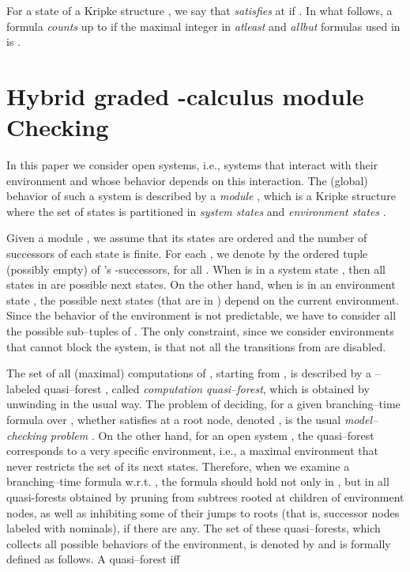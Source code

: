 \documentclass{LMCS}
\theoremstyle{plain}
\begin{document}
For a state  of a Kripke structure , we say that  \emph{satisfies}
 at  if . In what follows, a formula 
\emph{counts} up to  if the maximal integer in \emph{atleast} and
\emph{allbut} formulas used in  is .

\section{Hybrid graded -calculus module Checking}\label{sec:HybridGradedModuleChecking}
In this paper we consider open systems, i.e., systems that
interact with their environment and whose behavior depends on this
interaction. The (global) behavior of such a system is described
by a \emph{module} , which is a Kripke
structure where the set of states  is
partitioned in \emph{system states}  and \emph{environment
states} .

Given a module , we assume that its states are ordered and the
number of successors of each state  is finite. For each , we denote by  the ordered tuple (possibly empty) of
's -successors, for all . When  is
in a system state , then all states in  are
possible next states. On the other hand, when  is in an
environment state , the possible next states (that are in
) depend on the current environment. Since the behavior
of the environment is not predictable, we have to consider all the
possible sub--tuples of . The only constraint, since we
consider environments that cannot block the system, is that not
all the transitions from  are disabled.

The set of all (maximal) computations of , starting from
, is described by a --labeled quasi--forest
, called \emph{computation
quasi--forest}, which is obtained by unwinding  in the usual
way. The problem of deciding, for a given branching--time formula
 over , whether  satisfies  at a root node,
denoted , is the usual \emph{model--checking
problem} \cite{CE81,QS81}. On the other hand, for an open system
, the quasi--forest 
corresponds to a very specific environment, i.e., a maximal
environment that never restricts the set of its next states.
Therefore, when we examine a branching--time formula 
w.r.t. , the formula  should hold not only in
, but in all quasi-forests
obtained by pruning from 
subtrees rooted at children of environment nodes, as well as
inhibiting some of their jumps to roots (that is, successor nodes
labeled with nominals), if there are any. The set of these
quasi--forests, which collects all possible behaviors of the
environment, is denoted by  and is formally defined as
follows. A quasi--forest  iff
\end{document}
